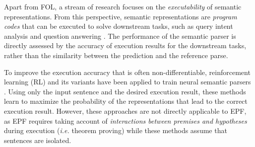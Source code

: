 Apart from FOL, a stream of research focuses on the \textit{executability} of semantic representations. From this perspective, semantic representations are \textit{program codes} that can be executed to solve downstream tasks, such as query intent analysis \citep{spider, dligach-etal-2022-exploring} and question answering \citep{semparse-qa}. The performance of the semantic parser is directly assessed by the accuracy of execution results for the downstream tasks, rather than the similarity between the prediction and the reference parse.

To improve the execution accuracy that is often non-differentiable, reinforcement learning (RL) and its variants have been applied to train neural semantic parsers \citep{cheng-etal-2019-learning, cheng-lapata-2018-weakly}. Using only the input sentence and the desired execution result, these methods learn to maximize the probability of the representations that lead to the correct execution result. However, these approaches are not directly applicable to EPF, as EPF requires taking account of \textit{interactions between premises and hypotheses} during execution (\textit{i.e.} theorem proving) while these methods assume that sentences are isolated.


